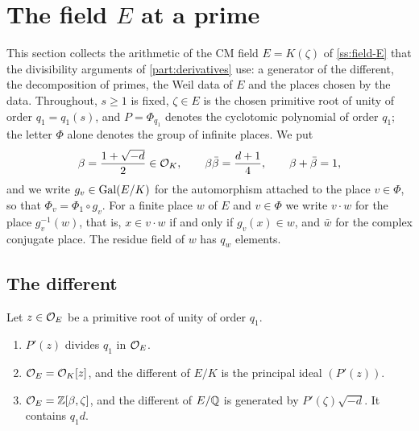 \section{The field \texorpdfstring{$E$}{E} at a prime}\label{sec:field}

This section collects the arithmetic of the CM field $E=K(\zeta)$ of \cref{ss:field-E} that the
divisibility arguments of \cref{part:derivatives} use: a generator of the different, the
decomposition of primes, the Weil data of $E$ and the places chosen by the data. Throughout, $s\ge1$
is fixed, $\zeta\in E$ is the chosen primitive root of unity of order $q_1=q_1(s)$, and $P=\Phi_{q_1}$
denotes the cyclotomic polynomial of order $q_1$; the letter $\Phi$ alone denotes the group of
infinite places. We put
\[
  \beta=\frac{1+\sqrt{-d}}2\in\mathcal{O}_K,\qquad \beta\bar\beta=\frac{d+1}4,\qquad \beta+\bar\beta=1,
\]
and we write $g_v\in\operatorname{Gal}(E/K)$ for the automorphism attached to the place $v\in\Phi$, so that
$\Phi_v=\Phi_1\circ g_v$. For a finite place $w$ of $E$ and $v\in\Phi$ we write $v\cdot w$ for the
place $g_v^{-1}(w)$, that is, $x\in v\cdot w$ if and only if $g_v(x)\in w$, and $\bar w$ for the
complex conjugate place. The residue field of $w$ has $q_w$ elements.

\subsection{The different}\label{ss:different}

\begin{proposition}\label{prop:different}
Let $z\in\mathcal{O}_E$ be a primitive root of unity of order $q_1$.
\begin{enumerate}[label=\textup{(\alph*)}]
\item $P'(z)$ divides $q_1$ in $\mathcal{O}_E$.
\item $\mathcal{O}_E=\mathcal{O}_K[z]$, and the different of $E/K$ is the principal ideal $(P'(z))$.
\item $\mathcal{O}_E=\mathbb{Z}[\beta,\zeta]$, and the different of $E/\mathbb{Q}$ is generated by $P'(\zeta)\sqrt{-d}$. It
contains $q_1d$.
\end{enumerate}
\end{proposition}

